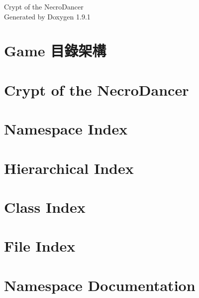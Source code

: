 \let\mypdfximage\pdfximage\def\pdfximage{\immediate\mypdfximage}\documentclass[twoside]{book}
\newcommand{\+}{\discretionary{\mbox{\scriptsize$\hookleftarrow$}}{}{}}
\newcommand{\clearemptydoublepage}{%
  \newpage{\pagestyle{empty}\cleardoublepage}%
}
\begin{document}
\raggedbottom

\hypersetup{pageanchor=false,
             bookmarksnumbered=true,
             pdfencoding=unicode
            }
\begin{titlepage}
\vspace*{7cm}
\begin{center}%
{\Large Crypt of the Necro\+Dancer }\\
\vspace*{1cm}
{\large Generated by Doxygen 1.9.1}\\
\end{center}
\end{titlepage}
\clearemptydoublepage
{}
\tableofcontents
\clearemptydoublepage
{}
\hypersetup{pageanchor=true}

\chapter{Game 目錄架構}
\label{md_include_Game_README}

\chapter{Crypt of the Necro\+Dancer}
\label{md_README}

\chapter{Namespace Index}

\chapter{Hierarchical Index}

\chapter{Class Index}

\chapter{File Index}

\chapter{Namespace Documentation}




















\end{document}
